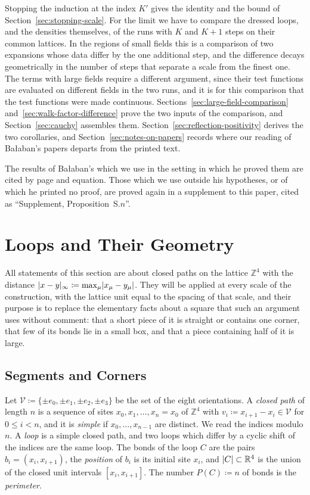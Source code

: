 \documentclass[11pt]{preprint}
\DeclarePairedDelimiter{\abs}{\lvert}{\rvert}
\numberwithin{equation}{section}
\theoremstyle{definition}
\theoremstyle{remark}
\theoremstyle{plain}
\begin{document}
Stopping the induction at the index $K'$ gives the identity and the bound of Section~\ref{sec:stopping-scale}. For the limit we have to compare the dressed loops, and the densities themselves, of the runs with $K$ and $K + 1$ steps on their common lattices. In the regions of small fields this is a comparison of two expansions whose data differ by the one additional step, and the difference decays geometrically in the number of steps that separate a scale from the finest one. The terms with large fields require a different argument, since their test functions are evaluated on different fields in the two runs, and it is for this comparison that the test functions were made continuous. Sections~\ref{sec:large-field-comparison} and~\ref{sec:walk-factor-difference} prove the two inputs of the comparison, and Section~\ref{sec:cauchy} assembles them. Section~\ref{sec:reflection-positivity} derives the two corollaries, and Section~\ref{sec:notes-on-papers} records where our reading of Ba{\l}aban's papers departs from the printed text.

The results of Ba{\l}aban's which we use in the setting in which he proved them are cited by page and equation. Those which we use outside his hypotheses, or of which he printed no proof, are proved again in a supplement to this paper, cited as ``Supplement, Proposition~S.$n$''.

\section{Loops and Their Geometry}\label{sec:loops}

All statements of this section are about closed paths on the lattice $\mathbb Z^4$ with the distance $\abs{x - y}_\infty \coloneqq \max_\mu\abs{x_\mu - y_\mu}$. They will be applied at every scale of the construction, with the lattice unit equal to the spacing of that scale, and their purpose is to replace the elementary facts about a square that such an argument uses without comment: that a short piece of it is straight or contains one corner, that few of its bonds lie in a small box, and that a piece containing half of it is large.

\subsection{Segments and Corners}\label{sec:segments-corners}

Let $\mathcal V \coloneqq \{ \pm e_0, \pm e_1, \pm e_2, \pm e_3 \}$ be the set of the eight orientations. A \emph{closed path} of length $n$ is a sequence of sites $x_0, x_1, \dots, x_n = x_0$ of $\mathbb Z^4$ with $v_i \coloneqq x_{i+1} - x_i \in \mathcal V$ for $0 \leq i < n$, and it is \emph{simple} if $x_0, \dots, x_{n-1}$ are distinct. We read the indices modulo $n$. A \emph{loop} is a simple closed path, and two loops which differ by a cyclic shift of the indices are the same loop. The bonds of the loop $C$ are the pairs $b_i = (x_i, x_{i+1})$, the \emph{position} of $b_i$ is its initial site $x_i$, and $\abs{C} \subset \mathbb R^4$ is the union of the closed unit intervals $[x_i, x_{i+1}]$. The number $P(C) \coloneqq n$ of bonds is the \emph{perimeter}.
\end{document}
